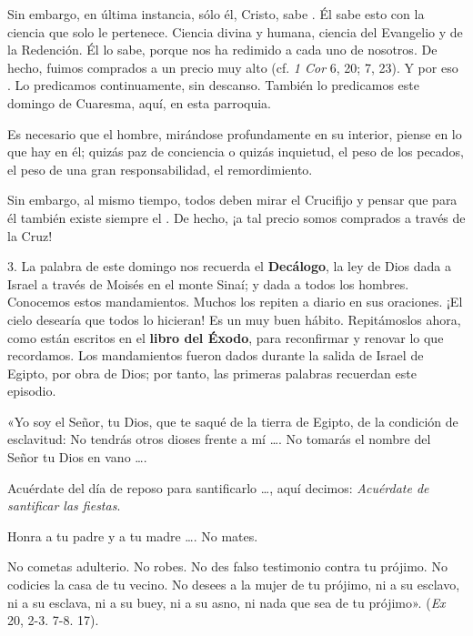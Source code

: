 \begin{body}
Sin embargo, en última instancia, sólo él, Cristo, sabe . Él sabe esto con la ciencia que solo le pertenece. Ciencia divina y humana, ciencia del Evangelio y de la Redención. Él lo sabe, porque nos ha redimido a cada uno de nosotros. De hecho, fuimos comprados a un precio muy alto (cf. \textit{1 Cor} 6, 20; 7, 23). Y por eso . Lo predicamos continuamente, sin descanso. También lo predicamos este domingo de Cuaresma, aquí, en esta parroquia.

Es necesario que el hombre, mirándose profundamente en su interior, piense en lo que hay en él; quizás paz de conciencia o quizás inquietud, el peso de los pecados, el peso de una gran responsabilidad, el remordimiento.

Sin embargo, al mismo tiempo, todos deben mirar el Crucifijo y pensar que para él también existe siempre el . De hecho, ¡a tal precio somos comprados a través de la Cruz!

3. La palabra de este domingo nos recuerda el \textbf{Decálogo}, la ley de Dios dada a Israel a través de Moisés en el monte Sinaí; y dada a todos los hombres. Conocemos estos mandamientos. Muchos los repiten a diario en sus oraciones. ¡El cielo desearía que todos lo hicieran! Es un muy buen hábito. Repitámoslos ahora, como están escritos en el \textbf{libro del Éxodo}, para reconfirmar y renovar lo que recordamos. Los mandamientos fueron dados durante la salida de Israel de Egipto, por obra de Dios; por tanto, las primeras palabras recuerdan este episodio.

\begin{bodyprose}
«Yo soy el Señor, tu Dios, que te saqué de la tierra de Egipto, de la condición de esclavitud:
   No tendrás otros dioses frente a mí \ldots.
   No tomarás el nombre del Señor tu Dios en vano \ldots.

Acuérdate del día de reposo para santificarlo \ldots, 
   aquí decimos: \textit{Acuérdate de santificar las fiestas}.

Honra a tu padre y a tu madre \ldots.
   No mates.

No cometas adulterio.
   No robes.
   No des falso testimonio contra tu prójimo.
   No codicies la casa de tu vecino. 
   No desees a la mujer de tu prójimo, ni a su esclavo, ni a su esclava, 
   ni a su buey, ni a su asno, ni nada que sea de tu prójimo». 
(\textit{Ex} 20, 2-3. 7-8. 17).
\end{bodyprose}


\end{body}
